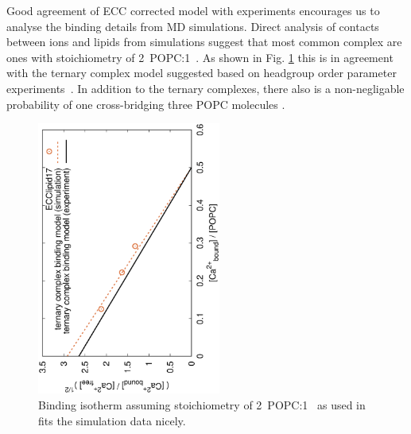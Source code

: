 \documentclass[aip,jcp,twocolumn]{revtex4}
\begin{document}
Good agreement of ECC corrected model with experiments encourages us to analyse the
binding details from MD simulations. Direct analysis of contacts between ions and
lipids from simulations suggest that most common complex are ones with stoichiometry
of 2~POPC:1~.
As shown in Fig. \ref{fig:cacl-bind} this is in agreement
with the ternary complex model suggested based on headgroup order parameter
experiments~\cite{altenbach84}.
In addition to the ternary complexes, there also is a non-negligable probability
of one  cross-bridging three POPC molecules
. 




\begin{figure}[]
  \centering
  \includegraphics[height=9.0cm,angle=-90]{../Fig/bound-CAs_conc-eccl17.eps}
  \caption{\label{fig:cacl-bind}
    Binding isotherm assuming stoichiometry of 2~POPC:1~ as used in \cite{altenbach84} fits the simulation data nicely.}
\end{figure}
\end{document}

